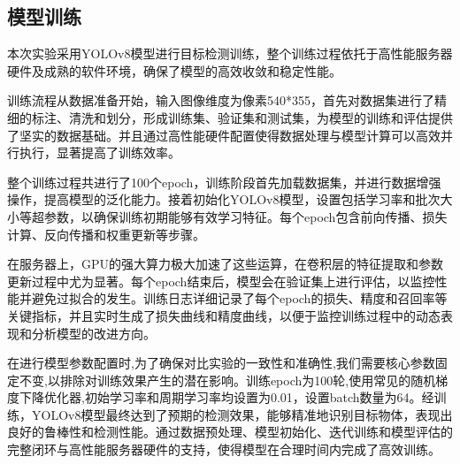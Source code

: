 \documentclass[journal]{IEEEtran}
\begin{document}
\subsection{模型训练}
本次实验采用YOLOv8模型进行目标检测训练，整个训练过程依托于高性能服务器硬件及成熟的软件环境，确保了模型的高效收敛和稳定性能。\par
训练流程从数据准备开始，输入图像维度为像素540*355，首先对数据集进行了精细的标注、清洗和划分，形成训练集、验证集和测试集，为模型的训练和评估提供了坚实的数据基础。并且通过高性能硬件配置使得数据处理与模型计算可以高效并行执行，显著提高了训练效率。\par
整个训练过程共进行了100个epoch，训练阶段首先加载数据集，并进行数据增强操作，提高模型的泛化能力。接着初始化YOLOv8模型，设置包括学习率和批次大小等超参数，以确保训练初期能够有效学习特征。每个epoch包含前向传播、损失计算、反向传播和权重更新等步骤。\par
在服务器上，GPU的强大算力极大加速了这些运算，在卷积层的特征提取和参数更新过程中尤为显著。每个epoch结束后，模型会在验证集上进行评估，以监控性能并避免过拟合的发生。训练日志详细记录了每个epoch的损失、精度和召回率等关键指标，并且实时生成了损失曲线和精度曲线，以便于监控训练过程中的动态表现和分析模型的改进方向。\par
在进行模型参数配置时,为了确保对比实验的一致性和准确性,我们需要核心参数固定不变,以排除对训练效果产生的潜在影响。训练epoch为100轮,使用常见的随机梯度下降优化器,初始学习率和周期学习率均设置为0.01，设置batch数量为64。经训练，YOLOv8模型最终达到了预期的检测效果，能够精准地识别目标物体，表现出良好的鲁棒性和检测性能。通过数据预处理、模型初始化、迭代训练和模型评估的完整闭环与高性能服务器硬件的支持，使得模型在合理时间内完成了高效训练。\par

\end{document}
